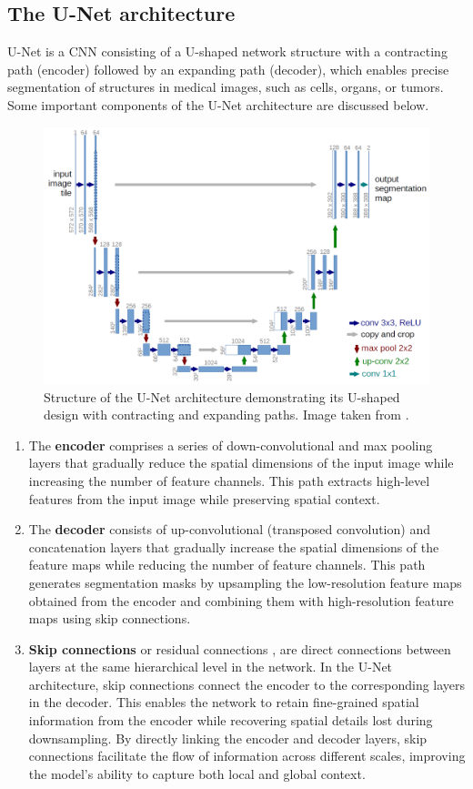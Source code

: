 \subsection{The U-Net architecture}
U-Net \cite{unet} is a CNN consisting of a U-shaped network structure with a contracting path (encoder) followed by an expanding path (decoder), which enables precise segmentation of structures in medical images, such as cells, organs, or tumors. Some important components of the U-Net architecture are discussed below. 
\begin{figure}[ht]
    \centering
    \includegraphics[width=12cm]{images/Theory-DL/UNet.png}
    \caption{Structure of the U-Net architecture demonstrating its U-shaped design with contracting and expanding paths. Image taken from \cite{unet}.}
    \label{fig:UNet}
\end{figure}
\begin{enumerate}
  \item The \textbf{encoder} comprises a series of down-convolutional and max pooling layers that gradually reduce the spatial dimensions of the input image while increasing the number of feature channels. This path extracts high-level features from the input image while preserving spatial context.
  \item The \textbf{decoder} consists of up-convolutional (transposed convolution) and concatenation layers that gradually increase the spatial dimensions of the feature maps while reducing the number of feature channels. This path generates segmentation masks by upsampling the low-resolution feature maps obtained from the encoder and combining them with high-resolution feature maps using skip connections.
  \item \textbf{Skip connections} or residual connections \cite{he2016deep}, are direct connections between layers at the same hierarchical level in the network. In the U-Net architecture, skip connections connect the encoder to the corresponding layers in the decoder. This enables the network to retain fine-grained spatial information from the encoder while recovering spatial details lost during downsampling. By directly linking the encoder and decoder layers, skip connections facilitate the flow of information across different scales, improving the model's ability to capture both local and global context.
\end{enumerate}
